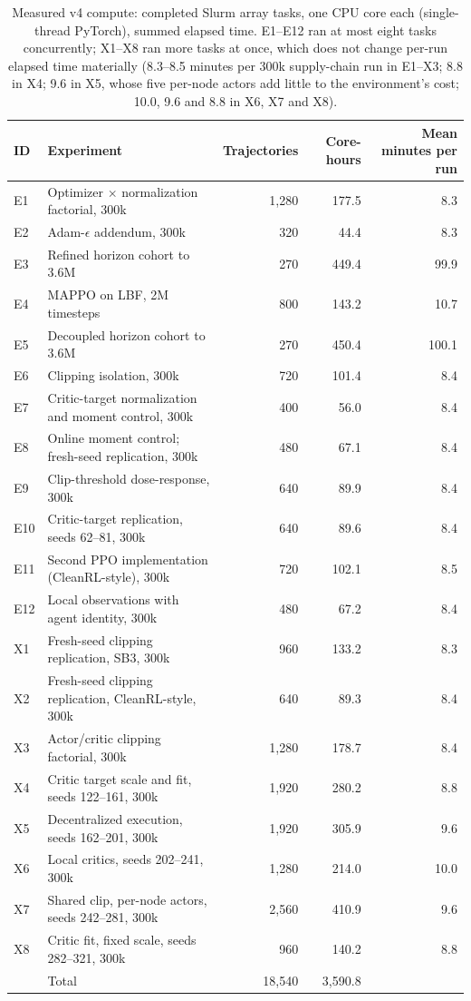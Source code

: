 \begin{table}[H]
\caption{Measured v4 compute: completed Slurm array tasks, one CPU core each (single-thread PyTorch), summed elapsed time. E1--E12 ran at most eight tasks concurrently; X1--X8 ran more tasks at once, which does not change per-run elapsed time materially (8.3--8.5 minutes per 300k supply-chain run in E1--X3; 8.8 in X4; 9.6 in X5, whose five per-node actors add little to the environment's cost; 10.0, 9.6 and 8.8 in X6, X7 and X8).}
\label{tab:compute_v4}
\centering\small
\begin{tabular}{@{}llrrr@{}}
\toprule
ID & Experiment & Trajectories & Core-hours & Mean minutes per run \\
\midrule
E1 & Optimizer $\times$ normalization factorial, 300k & 1,280 & 177.5 & 8.3 \\
E2 & Adam-$\epsilon$ addendum, 300k & 320 & 44.4 & 8.3 \\
E3 & Refined horizon cohort to 3.6M & 270 & 449.4 & 99.9 \\
E4 & MAPPO on LBF, 2M timesteps & 800 & 143.2 & 10.7 \\
E5 & Decoupled horizon cohort to 3.6M & 270 & 450.4 & 100.1 \\
E6 & Clipping isolation, 300k & 720 & 101.4 & 8.4 \\
E7 & Critic-target normalization and moment control, 300k & 400 & 56.0 & 8.4 \\
E8 & Online moment control; fresh-seed replication, 300k & 480 & 67.1 & 8.4 \\
E9 & Clip-threshold dose-response, 300k & 640 & 89.9 & 8.4 \\
E10 & Critic-target replication, seeds 62--81, 300k & 640 & 89.6 & 8.4 \\
E11 & Second PPO implementation (CleanRL-style), 300k & 720 & 102.1 & 8.5 \\
E12 & Local observations with agent identity, 300k & 480 & 67.2 & 8.4 \\
X1 & Fresh-seed clipping replication, SB3, 300k & 960 & 133.2 & 8.3 \\
X2 & Fresh-seed clipping replication, CleanRL-style, 300k & 640 & 89.3 & 8.4 \\
X3 & Actor/critic clipping factorial, 300k & 1,280 & 178.7 & 8.4 \\
X4 & Critic target scale and fit, seeds 122--161, 300k & 1,920 & 280.2 & 8.8 \\
X5 & Decentralized execution, seeds 162--201, 300k & 1,920 & 305.9 & 9.6 \\
X6 & Local critics, seeds 202--241, 300k & 1,280 & 214.0 & 10.0 \\
X7 & Shared clip, per-node actors, seeds 242--281, 300k & 2,560 & 410.9 & 9.6 \\
X8 & Critic fit, fixed scale, seeds 282--321, 300k & 960 & 140.2 & 8.8 \\
 & Total & 18,540 & 3,590.8 &  \\
\bottomrule
\end{tabular}
\end{table}
